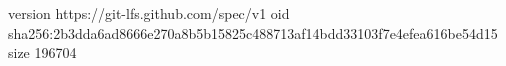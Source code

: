 version https://git-lfs.github.com/spec/v1
oid sha256:2b3dda6ad8666e270a8b5b15825c488713af14bdd33103f7e4efea616be54d15
size 196704
